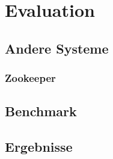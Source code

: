 \chapter{Evaluation}
\label{eval}

\section{Andere Systeme}

\subsection{Zookeeper}

\section{Benchmark}

\section{Ergebnisse}

